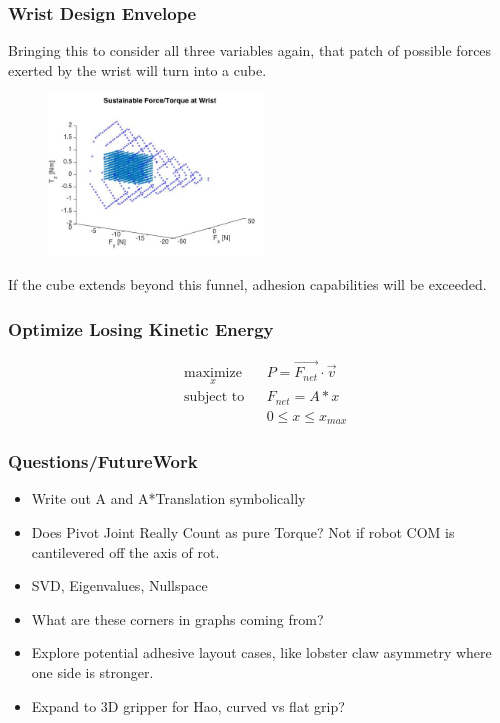 \documentclass{beamer}
\begin{document}
\frame
{
\frametitle{ Wrist Design Envelope}

Bringing this to consider all three variables again, that patch of possible forces exerted by the wrist will turn into a cube. 

\begin{figure}[htb]
	\centering
	\includegraphics[width=2.25in]{images/WristConstraints.jpg}
	\caption{}
\end{figure}

If the cube extends beyond this funnel, adhesion capabilities will be exceeded. 

}

\frame
{
\frametitle{Optimize Losing Kinetic Energy}

\begin{equation*}
	\begin{aligned}
	& \underset{x}{\text{maximize}}
	& & P = \vec{F_{net} } \cdot \vec{v} \\
	& \text{subject to}
	& & F_{net} = A * x \\
	&
	& & 0 \leq x \leq x_{max}
	\end{aligned}
\end{equation*}

}

\frame
{
\frametitle{ Questions/FutureWork }

\begin{itemize}

	\item Write out A and A*Translation symbolically
	\item Does Pivot Joint Really Count as pure Torque? Not if robot COM is cantilevered off the axis of rot. 
	\item SVD, Eigenvalues, Nullspace
	\item What are these corners in graphs coming from? 
	\item Explore potential adhesive layout cases, like lobster claw asymmetry where one side is stronger. 
	\item Expand to 3D gripper for Hao, curved vs flat grip? 
\end{itemize}

}
\end{document}
